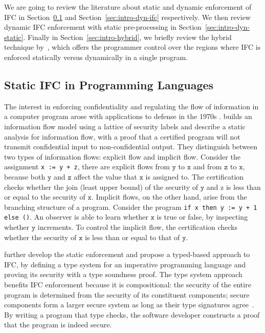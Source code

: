 \documentclass[10pt, letterpaper]{article}
\newcommand{\key}[1]{\ensuremath{\mathtt{#1}}}
\begin{document}
We are going to review the literature about static and dynamic enforcement of
IFC in Section~\ref{sec:intro-static-ifc} and Section~\ref{sec:intro-dyn-ifc}
respectively. We then review dynamic IFC enforcement with static pre-processing
in Section~\ref{sec:intro-dyn-static}. Finally in
Section~\ref{sec:intro-hybrid}, we briefly review the hybrid technique
by~\citet{Buiras:2015aa}, which offers the programmer control over the
regions where IFC is enforced statically versus dynamically in a single program.

\subsection{Static IFC in Programming Languages}
\label{sec:intro-static-ifc}

The interest in enforcing confidentiality and regulating the flow of information
in a computer program arose with applications to defense in the 1970s
\citep{bell1976secure}. \citet{denning1976lattice} builds an information
flow model using a lattice of security labels and
\citet{denning1977certification} describe a static analysis for information
flow, with a proof that a certified program will not transmit confidential input
to non-confidential output. They distinguish between two types of information
flows: explicit flow and implicit flow. Consider the assignment \texttt{x := y +
  z}, there are explicit flows from \key{y} to \key{x} and from \key{z} to
\key{x}, because both \key{y} and \key{z} affect the value that \key{x} is
assigned to. The certification checks whether the join (least upper bound) of
the security of \key{y} and {z} is less than or equal to the security of
\key{x}. Implicit flows, on the other hand, arise from the branching structure
of a program. Consider the program \texttt{if x then y := y + 1 else ()}. An
observer is able to learn whether \key{x} is true or false, by inspecting
whether \key{y} increments. To control the implicit flow, the certification
checks whether the security of \key{x} is less than or equal to that of \key{y}.

\citet{volpano1996sound} further develop the static enforcement and propose a
typed-based approach to IFC, by defining a type system for an imperative
programming language and proving its security with a type soundness proof. The
type system approach benefits IFC enforcement because it is compositional: the
security of the entire program is determined from the security of its
constituent components; secure components form a larger secure system as long as
their type signatures agree~\cite{sabelfeld2003language}. By writing a program
that type checks, the software developer constructs a proof that the program is
indeed secure.
\end{document}
